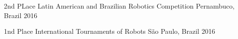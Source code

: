 



\begin{cvhonors}

  \cvhonor
    {2nd PLace} %
    {Latin American and Brazilian Robotics Competition} %
    {Pernambuco, Brazil} %
    {2016} %

  \cvhonor
    {1nd Place} %
    {International Tournaments of Robots} %
    {São Paulo, Brazil} %
    {2016} %
    

\end{cvhonors}





